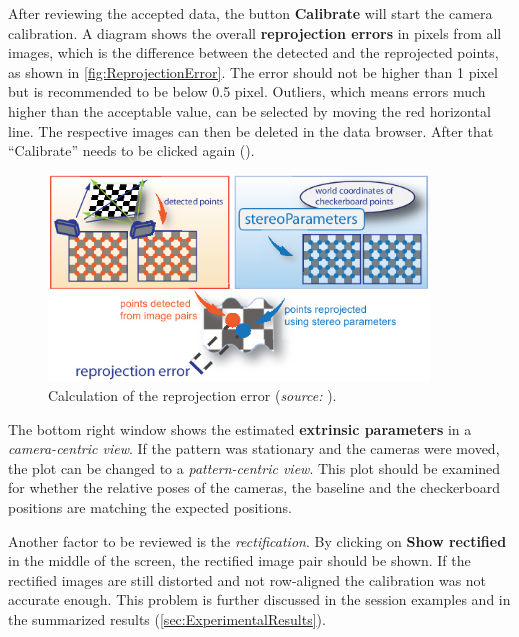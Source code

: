 After reviewing the accepted data, the button \textbf{Calibrate} will start the camera calibration. A diagram shows the overall \textbf{reprojection errors} in pixels from all images, which is the difference between the detected and the reprojected points, as shown in \autoref{fig:ReprojectionError}. The error should not be higher than 1 pixel but is recommended to be below 0.5 pixel. Outliers, which means errors much higher than the acceptable value, can be selected by moving the red horizontal line. The respective images can then be deleted in the data browser. After that \enquote{Calibrate} needs to be clicked again (\cite{StereoCalib.2016}).

\begin{figure}[htbp]
		\centering
		\includegraphics[width=0.9\textwidth]{figures/ReprojectionError}
		\caption[Calculation of the reprojection error]{Calculation of the reprojection error (\textit{source:} \cite{StereoCalib.2016}).}
		\label{fig:ReprojectionError}
\end{figure}

The bottom right window shows the estimated \textbf{extrinsic parameters} in a \textit{camera-centric view}. If the pattern was stationary and the cameras were moved, the plot can be changed to a \textit{pattern-centric view}. This plot should be examined for whether the relative poses of the cameras, the baseline and the checkerboard positions are matching the expected positions. 

Another factor to be reviewed is the \textit{rectification}. By clicking on \textbf{Show rectified} in the middle of the screen, the rectified image pair should be shown. If the rectified images are still distorted and not row-aligned the calibration was not accurate enough. This problem is further discussed in the session examples and in the summarized results (\autoref{sec:ExperimentalResults}).

